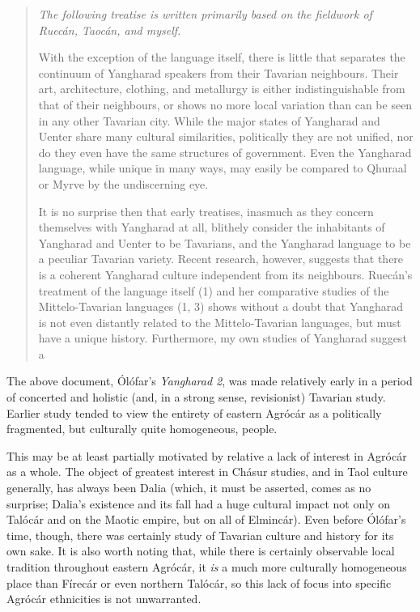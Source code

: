 \documentclass{article}
\begin{document}
\color{black}
\begin{quotation}

\textit{The following treatise is written primarily based on the fieldwork of Ruecán, Taocán, and myself.}

\hfill

With the exception of the language itself, there is little that separates the continuum of Yangharad speakers from their Tavarian neighbours. Their art, architecture, clothing, and metallurgy is either indistinguishable from that of their neighbours, or shows no more local variation than can be seen in any other Tavarian city. While the major states of Yangharad and Uenter share many cultural similarities, politically they are not unified, nor do they even have the same structures of government. Even the Yangharad language, while unique in many ways, may easily be compared to Qhuraal or Myrve by the undiscerning eye.

It is no surprise then that early treatises, inasmuch as they concern themselves with Yangharad at all, blithely consider the inhabitants of Yangharad and Uenter to be Tavarians, and the Yangharad language to be a peculiar Tavarian variety. Recent research, however, suggests that there is a coherent Yangharad culture independent from its neighbours. Ruecán's treatment of the language itself (1) and her comparative studies of the Mittelo-Tavarian languages (1, 3) shows without a doubt that Yangharad is not even distantly related to the Mittelo-Tavarian languages, but must have a unique history. Furthermore, my own studies of Yangharad suggest a

\end{quotation}

\color{DarkGreen}


The above document, Ólófar's \textit{Yangharad 2}, was made relatively early in a period of concerted and holistic (and, in a strong sense, revisionist) Tavarian study. Earlier study tended to view the entirety of eastern Agrócár as a politically fragmented, but culturally quite homogeneous, people.

This may be at least partially motivated by relative a lack of interest in Agrócár as a whole. The object of greatest interest in Chásur studies, and in Taol culture generally, has always been Dalia (which, it must be asserted, comes as no surprise; Dalia's existence and its fall had a huge cultural impact not only on Talócár and on the Maotic empire, but on all of Elmincár). Even before Ólófar's time, though, there was certainly study of Tavarian culture and history for its own sake. It is also worth noting that, while there is certainly observable local tradition throughout eastern Agrócár, it \emph{is} a much more culturally homogeneous place than Fírecár or even northern Talócár, so this lack of focus into specific Agrócár ethnicities is not unwarranted.
\end{document}
